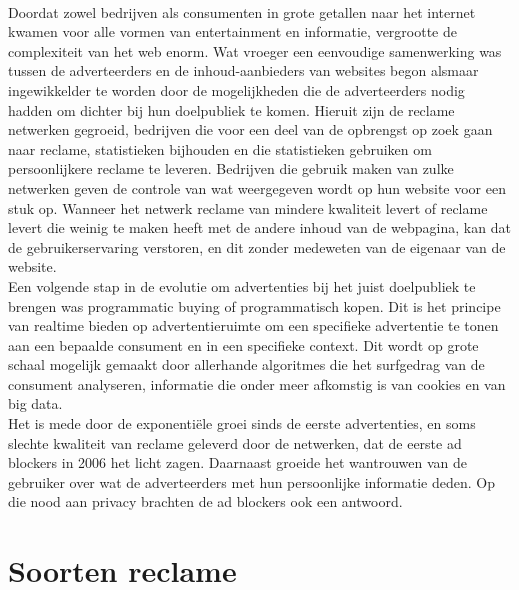 \documentclass[pdftex,a4paper,12pt,twoside]{report}
\begin{document}
\\
Doordat zowel bedrijven als consumenten in grote getallen naar het internet kwamen voor alle vormen van entertainment en informatie, vergrootte de complexiteit van het web enorm. Wat vroeger een eenvoudige samenwerking was tussen de adverteerders en de inhoud-aanbieders van websites begon alsmaar ingewikkelder te worden door de mogelijkheden die de adverteerders nodig hadden om dichter bij hun doelpubliek te komen. Hieruit zijn de reclame netwerken gegroeid, bedrijven die voor een deel van de opbrengst op zoek gaan naar reclame, statistieken bijhouden en die statistieken gebruiken om persoonlijkere reclame te leveren. Bedrijven die gebruik maken van zulke netwerken geven de controle van wat weergegeven wordt op hun website voor een stuk op. Wanneer het netwerk reclame van mindere kwaliteit levert of reclame levert die weinig te maken heeft met de andere inhoud van de webpagina, kan dat de gebruikerservaring verstoren, en dit zonder medeweten van de eigenaar van de website.
\\
Een volgende stap in de evolutie om advertenties bij het juist doelpubliek te brengen was programmatic buying of programmatisch kopen. Dit is het principe van realtime bieden op advertentieruimte om een specifieke advertentie te tonen aan een bepaalde consument en in een specifieke context. Dit wordt op grote schaal mogelijk gemaakt door allerhande algoritmes die het surfgedrag van de consument analyseren, informatie die onder meer afkomstig is van cookies en van big data.
\\
Het is mede door de exponentiële groei sinds de eerste advertenties, en soms slechte kwaliteit van reclame geleverd door de netwerken, dat de eerste ad blockers in 2006 het licht zagen. Daarnaast groeide het wantrouwen van de gebruiker over wat de adverteerders met hun persoonlijke informatie deden. Op die nood aan privacy brachten de ad blockers ook een antwoord.

\section{Soorten reclame}
\label{sec:Soorten reclame}
\end{document}
